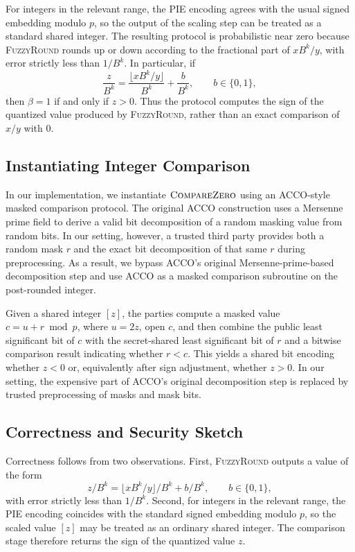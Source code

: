 For integers in the relevant range, the PIE encoding agrees with the
usual signed embedding modulo $p$, so the output of the scaling step
can be treated as a standard shared integer. The resulting protocol is
probabilistic near zero because \textsc{FuzzyRound} rounds up or down
according to the fractional part of $xB^k/y$, with error strictly less
than $1/B^k$. In particular, if
\[
\frac{z}{B^k}
=
\frac{\lfloor xB^k/y \rfloor}{B^k}
+
\frac{b}{B^k},
\qquad b \in \{0,1\},
\]
then $\beta = 1$ if and only if $z > 0$. Thus the protocol computes the
sign of the quantized value produced by \textsc{FuzzyRound}, rather
than an exact comparison of $x/y$ with $0$.

\subsection{Instantiating Integer Comparison} \label{sec:ACCO}

In our implementation, we instantiate $\textsc{CompareZero}$ using an
ACCO-style masked comparison protocol. The original ACCO construction
uses a Mersenne prime field to derive a valid bit decomposition of a
random masking value from random bits. In our setting, however, a
trusted third party provides both a random mask $r$ and the exact bit
decomposition of that same $r$ during preprocessing. As a result, we
bypass ACCO's original Mersenne-prime-based decomposition step and use
ACCO as a masked comparison subroutine on the post-rounded integer.

Given a shared integer $[z]$, the parties compute a masked value
$c = u + r \bmod p$, where $u = 2z$, open $c$, and then combine the
public least significant bit of $c$ with the secret-shared least
significant bit of $r$ and a bitwise comparison result indicating
whether $r < c$. This yields a shared bit encoding whether $z < 0$ or,
equivalently after sign adjustment, whether $z > 0$. In our setting,
the expensive part of ACCO's original decomposition step is replaced by
trusted preprocessing of masks and mask bits.

\subsection{Correctness and Security Sketch} \label{sec:LTZ-proofs}

Correctness follows from two observations. First, \textsc{FuzzyRound}
outputs a value of the form
\[
z/B^k = \lfloor xB^k/y \rfloor/B^k + b/B^k,
\qquad b \in \{0,1\},
\]
with error strictly less than $1/B^k$. Second, for integers in the
relevant range, the PIE encoding coincides with the standard signed
embedding modulo $p$, so the scaled value $[z]$ may be treated as an
ordinary shared integer. The comparison stage therefore returns the
sign of the quantized value $z$.

